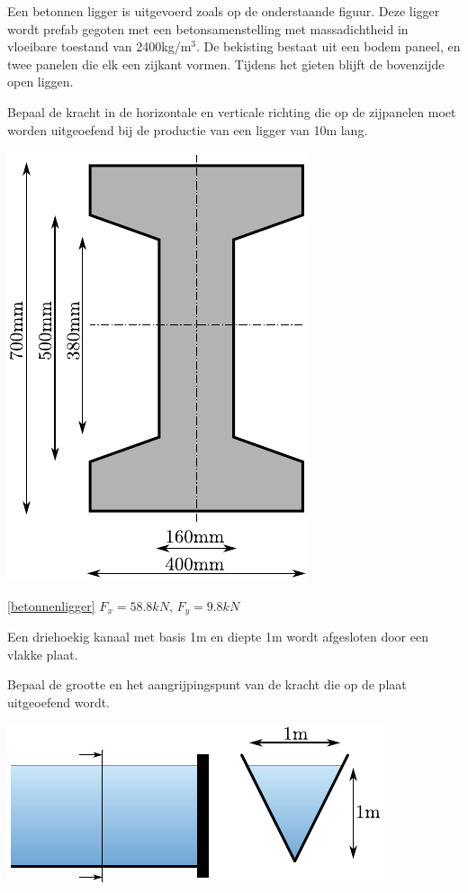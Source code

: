\begin{toepassing}[*]
	\label{betonnenligger}
Een betonnen ligger is uitgevoerd zoals op de onderstaande figuur. Deze ligger wordt prefab gegoten met een betonsamenstelling met massadichtheid in vloeibare toestand van 2400kg/m$^3$. De bekisting bestaat uit een bodem paneel, en twee panelen die elk een zijkant vormen. Tijdens het gieten blijft de bovenzijde open liggen.
		
Bepaal de kracht in de horizontale en verticale richting die op de zijpanelen moet worden uitgeoefend bij de productie van een ligger van 10m lang.

	\centering
	\includegraphics{fig/hydrostatica/betonnenligger}
\end{toepassing}
\begin{antwoord}{\ref{betonnenligger}}
	$F_x = 58.8\unit{kN}$, $F_y = 9.8\unit{kN}$
\end{antwoord}
\begin{toepassing}
	\label{driehoekig_kanaal}
Een driehoekig kanaal met basis 1m en diepte 1m wordt afgesloten door een vlakke plaat.
		
Bepaal de grootte en het aangrijpingspunt van de kracht die op de plaat uitgeoefend wordt.

	\centering
	\includegraphics{fig/hydrostatica/driehoekig_kanaal}
\end{toepassing}
